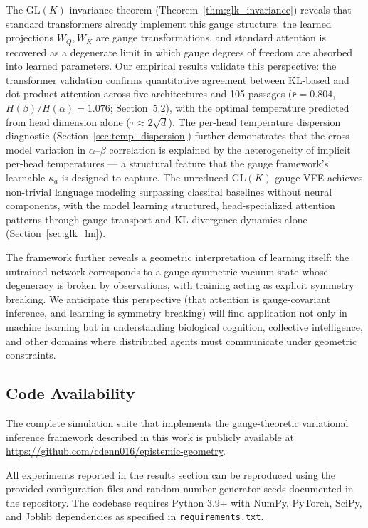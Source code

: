 \documentclass[twoside,11pt]{article}
\begin{document}
The $\mathrm{GL}(K)$ invariance theorem (Theorem~\ref{thm:glk_invariance}) reveals that standard transformers already implement this gauge structure: the learned projections $W_Q, W_K$ are gauge transformations, and standard attention is recovered as a degenerate limit in which gauge degrees of freedom are absorbed into learned parameters. Our empirical results validate this perspective: the transformer validation confirms quantitative agreement between KL-based and dot-product attention across five architectures and 105 passages ($\bar{r} = 0.804$, $H(\beta)/H(\alpha) = 1.076$; Section~5.2), with the optimal temperature predicted from head dimension alone ($\tau \approx 2\sqrt{d}$). The per-head temperature dispersion diagnostic (Section~\ref{sec:temp_dispersion}) further demonstrates that the cross-model variation in $\alpha$--$\beta$ correlation is explained by the heterogeneity of implicit per-head temperatures --- a structural feature that the gauge framework's learnable $\kappa_a$ is designed to capture. The unreduced $\mathrm{GL}(K)$ gauge VFE achieves non-trivial language modeling surpassing classical baselines without neural components, with the model learning structured, head-specialized attention patterns through gauge transport and KL-divergence dynamics alone (Section~\ref{sec:glk_lm}).

The framework further reveals a geometric interpretation of learning itself: the untrained network corresponds to a gauge-symmetric vacuum state whose degeneracy is broken by observations, with training acting as explicit symmetry breaking. We anticipate this perspective (that attention is gauge-covariant inference, and learning is symmetry breaking) will find application not only in machine learning but in understanding biological cognition, collective intelligence, and other domains where distributed agents must communicate under geometric constraints.


\subsection{Code Availability}
The complete simulation suite that implements the gauge-theoretic variational inference framework described in this work is publicly available at \href{https://github.com/cdenn016/epistemic-geometry}{https://github.com/cdenn016/epistemic-geometry}.


All experiments reported in the results section can be reproduced using the provided configuration files and random number generator seeds documented in the repository. The codebase requires Python 3.9+ with NumPy, PyTorch, SciPy, and Joblib dependencies as specified in \texttt{requirements.txt}.
\end{document}
